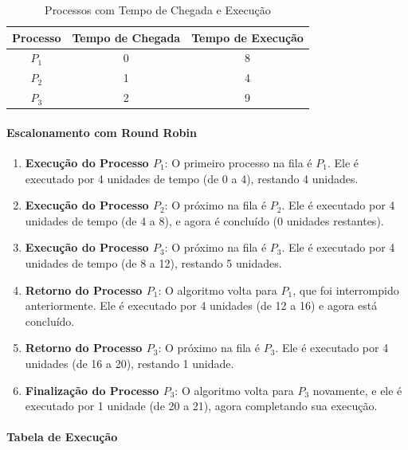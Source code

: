 \documentclass{article}
\begin{document}
\begin{table}[h]
    \centering
    \begin{tabular}{|c|c|c|}
        \hline
        \textbf{Processo} & \textbf{Tempo de Chegada} & \textbf{Tempo de Execução} \\
        \hline
        \( P_1 \) & 0 & 8 \\
        \( P_2 \) & 1 & 4 \\
        \( P_3 \) & 2 & 9 \\
        \hline
    \end{tabular}
    \caption{Processos com Tempo de Chegada e Execução}
    \label{tab:RRexemplo}
\end{table}

\paragraph{Escalonamento com Round Robin}

\begin{enumerate}
    \item \textbf{Execução do Processo \( P_1 \)}: O primeiro processo na fila é \( P_1 \). Ele é executado por 4 unidades de tempo (de 0 a 4), restando 4 unidades.
    \item \textbf{Execução do Processo \( P_2 \)}: O próximo na fila é \( P_2 \). Ele é executado por 4 unidades de tempo (de 4 a 8), e agora é concluído (0 unidades restantes).
    \item \textbf{Execução do Processo \( P_3 \)}: O próximo na fila é \( P_3 \). Ele é executado por 4 unidades de tempo (de 8 a 12), restando 5 unidades.
    \item \textbf{Retorno do Processo \( P_1 \)}: O algoritmo volta para \( P_1 \), que foi interrompido anteriormente. Ele é executado por 4 unidades (de 12 a 16) e agora está concluído.
    \item \textbf{Retorno do Processo \( P_3 \)}: O próximo na fila é \( P_3 \). Ele é executado por 4 unidades (de 16 a 20), restando 1 unidade.
    \item \textbf{Finalização do Processo \( P_3 \)}: O algoritmo volta para \( P_3 \) novamente, e ele é executado por 1 unidade (de 20 a 21), agora completando sua execução.
\end{enumerate}

\paragraph{Tabela de Execução}
\end{document}
